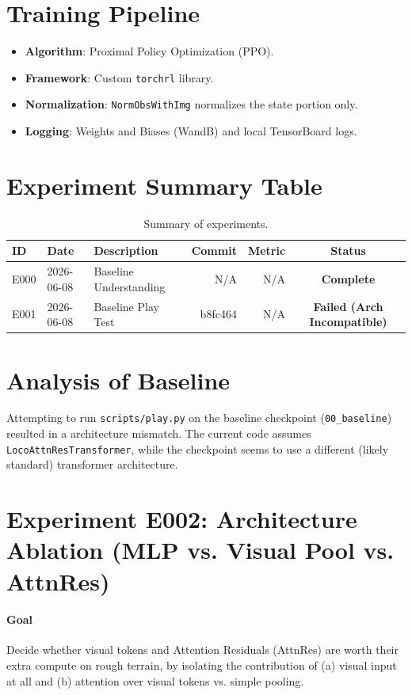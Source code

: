 \documentclass{article}
\begin{document}
\section{Training Pipeline}
\begin{itemize}
    \item \textbf{Algorithm}: Proximal Policy Optimization (PPO).
    \item \textbf{Framework}: Custom \texttt{torchrl} library.
    \item \textbf{Normalization}: \texttt{NormObsWithImg} normalizes the state portion only.
    \item \textbf{Logging}: Weights and Biases (WandB) and local TensorBoard logs.
\end{itemize}

\section{Experiment Summary Table}
\begin{table}[h!]
\centering
\setlength{\tabcolsep}{8pt}
\renewcommand{\arraystretch}{1.2}
\begin{tabular}{lllrrc}
\toprule
ID & Date & Description & Commit & Metric & Status \\
\midrule
E000 & 2026-06-08 & Baseline Understanding & N/A & N/A & \textbf{Complete} \\
E001 & 2026-06-08 & Baseline Play Test & b8fc464 & N/A & \textbf{Failed (Arch Incompatible)} \\
\bottomrule
\end{tabular}
\caption{Summary of experiments.}
\end{table}

\section{Analysis of Baseline}
Attempting to run \texttt{scripts/play.py} on the baseline checkpoint (\texttt{00\_baseline}) resulted in a architecture mismatch. The current code assumes \texttt{LocoAttnResTransformer}, while the checkpoint seems to use a different (likely standard) transformer architecture.

\section{Experiment E002: Architecture Ablation (MLP vs. Visual Pool vs. AttnRes)}

\paragraph{Goal}
Decide whether visual tokens and Attention Residuals (AttnRes) are worth their
extra compute on rough terrain, by isolating the contribution of (a) visual
input at all and (b) attention over visual tokens vs. simple pooling.
\end{document}
